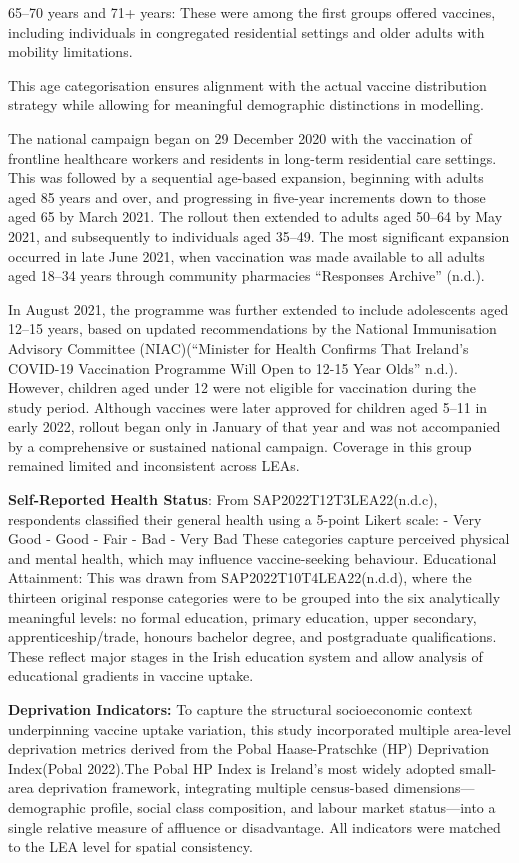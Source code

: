 \documentclass{article}
\begin{document}
65--70 years and 71+ years: These were among the first groups offered
vaccines, including individuals in congregated residential settings and
older adults with mobility limitations.

This age categorisation ensures alignment with the actual vaccine
distribution strategy while allowing for meaningful demographic
distinctions in modelling.

The national campaign began on 29 December 2020 with the vaccination of
frontline healthcare workers and residents in long-term residential care
settings. This was followed by a sequential age-based expansion,
beginning with adults aged 85 years and over, and progressing in
five-year increments down to those aged 65 by March 2021. The rollout
then extended to adults aged 50--64 by May 2021, and subsequently to
individuals aged 35--49. The most significant expansion occurred in late
June 2021, when vaccination was made available to all adults aged 18--34
years through community pharmacies {``Responses Archive''} (n.d.).

In August 2021, the programme was further extended to include
adolescents aged 12--15 years, based on updated recommendations by the
National Immunisation Advisory Committee (NIAC)({``Minister for {Health}
Confirms That {Ireland}'s {COVID}-19 {Vaccination} {Programme} Will Open
to 12-15 Year Olds''} n.d.). However, children aged under 12 were not
eligible for vaccination during the study period. Although vaccines were
later approved for children aged 5--11 in early 2022, rollout began only
in January of that year and was not accompanied by a comprehensive or
sustained national campaign. Coverage in this group remained limited and
inconsistent across LEAs.

\textbf{Self-Reported Health Status}: From SAP2022T12T3LEA22(n.d.c),
respondents classified their general health using a 5-point Likert
scale: - Very Good - Good - Fair - Bad - Very Bad These categories
capture perceived physical and mental health, which may influence
vaccine-seeking behaviour. Educational Attainment: This was drawn from
SAP2022T10T4LEA22(n.d.d), where the thirteen original response
categories were to be grouped into the six analytically meaningful
levels: no formal education, primary education, upper secondary,
apprenticeship/trade, honours bachelor degree, and postgraduate
qualifications. These reflect major stages in the Irish education system
and allow analysis of educational gradients in vaccine uptake.

\textbf{Deprivation Indicators:} To capture the structural socioeconomic
context underpinning vaccine uptake variation, this study incorporated
multiple area-level deprivation metrics derived from the Pobal
Haase-Pratschke (HP) Deprivation Index(Pobal 2022).The Pobal HP Index is
Ireland's most widely adopted small-area deprivation framework,
integrating multiple census-based dimensions---demographic profile,
social class composition, and labour market status---into a single
relative measure of affluence or disadvantage. All indicators were
matched to the LEA level for spatial consistency.
\end{document}
